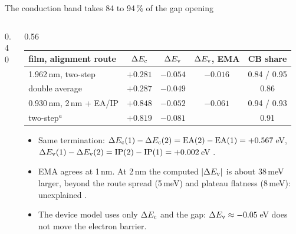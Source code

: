 \begin{frame}{The conduction band takes 84 to 94\,\% of the gap opening}
\begin{columns}[T,onlytextwidth]
\begin{column}{0.40\textwidth}
    \end{column}
    \begin{column}{0.56\textwidth}
      \begingroup\scriptsize
      \renewcommand{\arraystretch}{1.12}
      \setlength{\tabcolsep}{4.5pt}
      \begin{tabular}{@{}l c c c c@{}}
        \toprule
        film, alignment route & $\Delta E_{\mathrm{c}}$ & $\Delta E_{\mathrm{v}}$ & $\Delta E_{\mathrm{v}}$, EMA & CB share \\
        \midrule
        1.962\,nm, two-step & $+0.281$ & $-0.054$ & $-0.016$ & 0.84 / 0.95 \\
        \quad double average & $+0.287$ & $-0.049$ & & 0.86 \\
        0.930\,nm, 2\,nm + EA/IP & $+0.848$ & $-0.052$ & $-0.061$ & 0.94 / 0.93 \\
        \quad two-step$^{a}$ & $+0.819$ & $-0.081$ & & 0.91 \\
        \bottomrule
      \end{tabular}\par\endgroup
      \begin{itemize}
        \item Same termination: $\Delta E_{\mathrm{c}}(1) - \Delta E_{\mathrm{c}}(2) = \mathrm{EA}(2) - \mathrm{EA}(1) = +0.567$\,eV,
          $\Delta E_{\mathrm{v}}(1) - \Delta E_{\mathrm{v}}(2) = \mathrm{IP}(2) - \mathrm{IP}(1) = +0.002$\,eV .
        \item EMA agrees at 1\,nm. At 2\,nm the computed $|\Delta E_{\mathrm{v}}|$ is about 38\,meV larger, beyond the route spread
          (5\,meV) and plateau flatness (8\,meV): unexplained .
        \item The device model uses only $\Delta E_{\mathrm{c}}$ and the gap: $\Delta E_{\mathrm{v}} \approx -0.05$\,eV does not move the electron barrier.
      \end{itemize}
    \end{column}
  \end{columns}
\end{frame}

